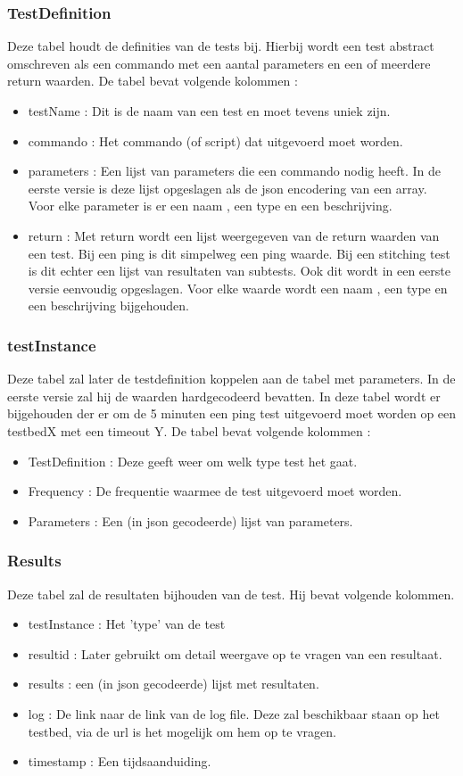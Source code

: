 \documentclass[11pt]{article}
\begin{document}
\subsubsection{TestDefinition}
Deze tabel houdt de definities van de tests bij.
Hierbij wordt een test abstract omschreven als een commando met een aantal parameters en een of meerdere return waarden.
De tabel bevat volgende kolommen :
\begin{itemize}
\item testName : Dit is de naam van een test en moet tevens uniek zijn.
\item commando : Het commando (of script) dat uitgevoerd moet worden.
\item parameters : Een lijst van parameters die een commando nodig heeft. In de eerste versie is deze lijst opgeslagen als de json encodering van een array.
Voor elke parameter is er een naam , een type en een beschrijving.
\item return : Met return wordt een lijst weergegeven van de return waarden van een test. Bij een ping is dit simpelweg een ping waarde. Bij een stitching test is dit echter een lijst van resultaten van subtests. Ook dit wordt in een eerste versie eenvoudig opgeslagen. Voor elke waarde wordt een naam , een type en een beschrijving bijgehouden.
\end{itemize}

\subsubsection{testInstance}
Deze tabel zal later de testdefinition koppelen aan de tabel met parameters. In de eerste versie zal hij de waarden hardgecodeerd bevatten.
In deze tabel wordt er bijgehouden der er om de 5 minuten een ping test uitgevoerd moet worden op een testbedX met een timeout Y.
De tabel bevat volgende kolommen : 
\begin{itemize}
\item TestDefinition : Deze geeft weer om welk type test het gaat.
\item Frequency : De frequentie waarmee de test uitgevoerd moet worden.
\item Parameters : Een (in json gecodeerde) lijst van parameters.
\end{itemize}

\subsubsection{Results}
Deze tabel zal de resultaten bijhouden van de test.
Hij bevat volgende kolommen.
\begin{itemize}
\item testInstance : Het 'type' van de test
\item resultid : Later gebruikt om detail weergave op te vragen van een resultaat.
\item results : een (in json gecodeerde) lijst met resultaten. 
\item log : De link naar de link van de log file. Deze zal beschikbaar staan op het testbed, via de url is het mogelijk om hem op te vragen.
\item timestamp : Een tijdsaanduiding.
\end{itemize}
\end{document}
